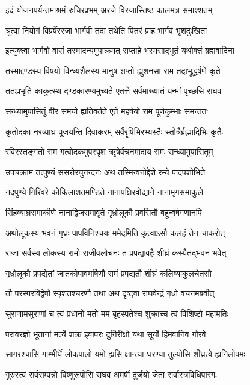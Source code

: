 \twolineshloka
{इदं योजनपर्यन्तमाश्रमं रुचिरप्रभम्}
{अरजे विरजास्तिष्ठ कालमत्र समाश्शतम्}%

\twolineshloka
{श्रुत्वा नियोगं विप्रर्षेररजा भार्गवी तदा}
{तथेति पितरं प्राह भार्गवं भृशदुःखिता}%

\twolineshloka
{इत्युक्त्वा भार्गवो वासं तस्मादन्यमुपाक्रमत्}
{सप्ताहे भस्मसाद्भूतं यथोक्तं ब्रह्मवादिना}%

\twolineshloka
{तस्माद्दण्डस्य विषयो विन्ध्यशैलस्य मानुष}
{शप्तो ह्युशनसा राम तदाभूद्धर्षणे कृते}%

\twolineshloka
{ततःप्रभृति काकुत्स्थ दण्डकारण्यमुच्यते}
{एतत्ते सर्वमाख्यातं यन्मां पृच्छसि राघव}%

\twolineshloka
{सन्ध्यामुपासितुं वीर समयो ह्यतिवर्तते}
{एते महर्षयो राम पूर्णकुम्भाः समन्ततः}%

\twolineshloka
{कृतोदका नरव्याघ्र पूजयन्ति दिवाकरम्}
{सर्वैरॄषिभिरभ्यस्तैः स्तोत्रैर्ब्रह्मादिभिः कृतैः}%

\twolineshloka
{रविरस्तङ्गतो राम गत्वोदकमुपस्पृश}
{ॠषेर्वचनमादाय रामः सन्ध्यामुपासितुम्}%

\twolineshloka
{उपचक्राम तत्पुण्यं ससरोरघुनन्दनः}
{अथ तस्मिन्वनोद्देशे रम्ये पादपशोभिते}%

\twolineshloka
{नदपुण्ये गिरिवरे कोकिलाशतमण्डिते}
{नानापक्षिरवोद्याने नानामृगसमाकुले}%

\twolineshloka
{सिंहव्याघ्रसमाकीर्णे नानाद्विजसमावृते}
{गृध्रोलूकौ प्रवसितौ बहून्वर्षगणानपि}%

\twolineshloka
{अथोलूकस्य भवनं गृध्रः पापविनिश्चयः}
{ममेदमिति कृत्वाऽसौ कलहं तेन चाकरोत्}%

\twolineshloka
{राजा सर्वस्य लोकस्य रामो राजीवलोचनः}
{तं प्रपद्यावहै शीघ्रं कस्यैतद्भवनं भवेत्}%

\twolineshloka
{गृध्रोलूकौ प्रपद्येतां जातकोपावमर्षिणौ}
{रामं प्रपद्यतौ शीघ्रं कलिव्याकुलचेतसौ}%

\twolineshloka
{तौ परस्परविद्वेषौ स्पृशतश्चरणौ तथा}
{अथ दृष्ट्वा राघवेन्द्रं गृध्रो वचनमब्रवीत्}%

\twolineshloka
{सुराणामसुराणां च त्वं प्रधानो मतो मम}
{बृहस्पतेश्च शुक्राच्च त्वं विशिष्टो महामतिः}%

\twolineshloka
{परावरज्ञो भूतानां मर्त्ये शक्र इवापरः}
{दुर्निरीक्षो यथा सूर्यो हिमवानिव गौरवे}%

\twolineshloka
{सागरश्चासि गाम्भीर्ये लोकपालो यमो ह्यसि}
{क्षान्त्या धरण्या तुल्योसि शीघ्रत्वे ह्यनिलोपमः}%

\twolineshloka
{गुरुस्त्वं सर्वसम्पन्नो विष्णुरूपोसि राघव}
{अमर्षी दुर्जयो जेता सर्वास्त्रविधिपारगः}%

